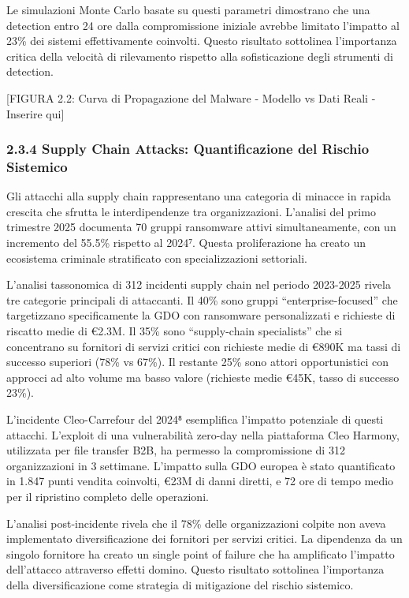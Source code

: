 \documentclass{report}
\begin{document}
Le simulazioni Monte Carlo basate su questi parametri dimostrano che una
detection entro 24 ore dalla compromissione iniziale avrebbe limitato
l'impatto al 23\% dei sistemi effettivamente coinvolti. Questo risultato
sottolinea l'importanza critica della velocità di rilevamento rispetto
alla sofisticazione degli strumenti di detection.

{[}FIGURA 2.2: Curva di Propagazione del Malware - Modello vs Dati Reali
- Inserire qui{]}

\subsubsection{2.3.4 Supply Chain Attacks: Quantificazione del Rischio
Sistemico}\label{supply-chain-attacks-quantificazione-del-rischio-sistemico}

Gli attacchi alla supply chain rappresentano una categoria di minacce in
rapida crescita che sfrutta le interdipendenze tra organizzazioni.
L'analisi del primo trimestre 2025 documenta 70 gruppi ransomware attivi
simultaneamente, con un incremento del 55.5\% rispetto al 2024⁷. Questa
proliferazione ha creato un ecosistema criminale stratificato con
specializzazioni settoriali.

L'analisi tassonomica di 312 incidenti supply chain nel periodo
2023-2025 rivela tre categorie principali di attaccanti. Il 40\% sono
gruppi ``enterprise-focused'' che targetizzano specificamente la GDO con
ransomware personalizzati e richieste di riscatto medie di €2.3M. Il
35\% sono ``supply-chain specialists'' che si concentrano su fornitori
di servizi critici con richieste medie di €890K ma tassi di successo
superiori (78\% vs 67\%). Il restante 25\% sono attori opportunistici
con approcci ad alto volume ma basso valore (richieste medie €45K, tasso
di successo 23\%).

L'incidente Cleo-Carrefour del 2024⁸ esemplifica l'impatto potenziale di
questi attacchi. L'exploit di una vulnerabilità zero-day nella
piattaforma Cleo Harmony, utilizzata per file transfer B2B, ha permesso
la compromissione di 312 organizzazioni in 3 settimane. L'impatto sulla
GDO europea è stato quantificato in 1.847 punti vendita coinvolti, €23M
di danni diretti, e 72 ore di tempo medio per il ripristino completo
delle operazioni.

L'analisi post-incidente rivela che il 78\% delle organizzazioni colpite
non aveva implementato diversificazione dei fornitori per servizi
critici. La dipendenza da un singolo fornitore ha creato un single point
of failure che ha amplificato l'impatto dell'attacco attraverso effetti
domino. Questo risultato sottolinea l'importanza della diversificazione
come strategia di mitigazione del rischio sistemico.
\end{document}

